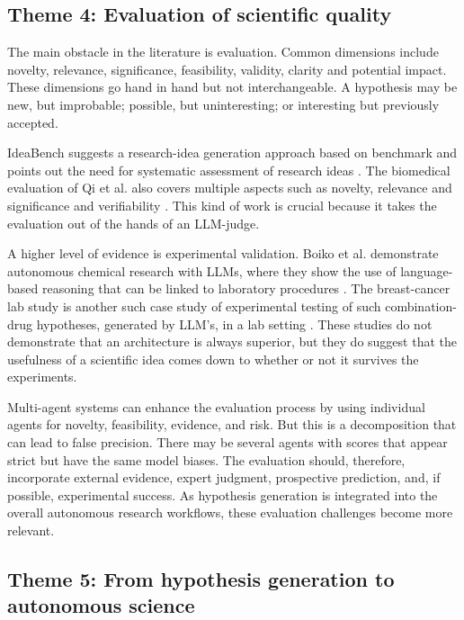 \documentclass[acmsmall,screen,review]{acmart}
\begin{document}
\subsection{Theme 4: Evaluation of scientific quality}
\label{subsec:evaluation-quality}

The main obstacle in the literature is evaluation. Common dimensions include novelty, relevance, significance, feasibility, validity, clarity and potential impact. These dimensions go hand in hand but not interchangeable. A hypothesis may be new, but improbable; possible, but uninteresting; or interesting but previously accepted.

IdeaBench suggests a research-idea generation approach based on benchmark and points out the need for systematic assessment of research ideas \cite{guo2025ideabench}. The biomedical evaluation of Qi et al. also covers multiple aspects such as novelty, relevance and significance and verifiability \cite{qi2024biomedical}. This kind of work is crucial because it takes the evaluation out of the hands of an LLM-judge.

A higher level of evidence is experimental validation. Boiko et al. demonstrate autonomous chemical research with LLMs, where they show the use of language-based reasoning that can be linked to laboratory procedures \cite{boiko2023autonomous}. The breast-cancer lab study is another such case study of experimental testing of such combination-drug hypotheses, generated by LLM's, in a lab setting \cite{scientific2025laboratory}. These studies do not demonstrate that an architecture is always superior, but they do suggest that the usefulness of a scientific idea comes down to whether or not it survives the experiments.

Multi-agent systems can enhance the evaluation process by using individual agents for novelty, feasibility, evidence, and risk. But this is a decomposition that can lead to false precision. There may be several agents with scores that appear strict but have the same model biases. The evaluation should, therefore, incorporate external evidence, expert judgment, prospective prediction, and, if possible, experimental success. As hypothesis generation is integrated into the overall autonomous research workflows, these evaluation challenges become more relevant.


\subsection{Theme 5: From hypothesis generation to autonomous science}
\label{subsec:autonomous-science}
\end{document}
